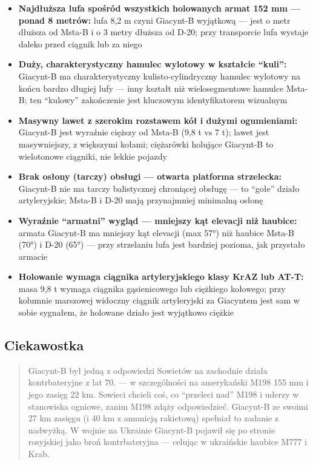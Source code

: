 \documentclass[12pt,oneside]{book}
\providecommand{\tightlist}{%
  \setlength{\itemsep}{0pt}\setlength{\parskip}{0pt}}
\begin{document}
\begin{itemize}
\tightlist
\item
  \textbf{Najdłuższa lufa spośród wszystkich holowanych armat 152 mm ---
  ponad 8 metrów:} lufa 8,2 m czyni Giacynt-B wyjątkową --- jest o metr
  dłuższa od Msta-B i o 3 metry dłuższa od D-20; przy transporcie lufa
  wystaje daleko przed ciągnik lub za niego
\item
  \textbf{Duży, charakterystyczny hamulec wylotowy w kształcie
  ``kuli'':} Giacynt-B ma charakterystyczny kulisto-cylindryczny hamulec
  wylotowy na końcu bardzo długiej lufy --- inny kształt niż
  wielosegmentowe hamulce Msta-B; ten ``kulowy'' zakończenie jest
  kluczowym identyfikatorem wizualnym
\item
  \textbf{Masywny lawet z szerokim rozstawem kół i dużymi ogumieniami:}
  Giacynt-B jest wyraźnie cięższy od Msta-B (9,8 t vs 7 t); lawet jest
  masywniejszy, z większymi kołami; ciężarówki holujące Giacynt-B to
  wielotonowe ciągniki, nie lekkie pojazdy
\item
  \textbf{Brak osłony (tarczy) obsługi --- otwarta platforma
  strzelecka:} Giacynt-B nie ma tarczy balistycznej chroniącej obsługę
  --- to ``gołe'' działo artyleryjskie; Msta-B i D-20 mają przynajmniej
  minimalną osłonę
\item
  \textbf{Wyraźnie ``armatni'' wygląd --- mniejszy kąt elevacji niż
  haubice:} armata Giacynt-B ma mniejszy kąt elevacji (max 57°) niż
  haubice Msta-B (70°) i D-20 (65°) --- przy strzelaniu lufa jest
  bardziej pozioma, jak przystało armacie
\item
  \textbf{Holowanie wymaga ciągnika artyleryjskiego klasy KrAZ lub
  AT-T:} masa 9,8 t wymaga ciągnika gąsienicowego lub ciężkiego
  kołowego; przy kolumnie marszowej widoczny ciągnik artyleryjski za
  Giacyntem jest sam w sobie sygnałem, że holowane działo jest wyjątkowo
  ciężkie
\end{itemize}

\subsection{Ciekawostka}\label{ciekawostka-32}

\begin{quote}
Giacynt-B był jedną z odpowiedzi Sowietów na zachodnie działa
kontrbateryjne z lat 70. --- w szczególności na amerykański M198 155 mm
i jego zasięg 22 km. Sowieci chcieli coś, co ``przeleci nad'' M198 i
uderzy w stanowiska ogniowe, zanim M198 zdąży odpowiedzieć. Giacynt-B ze
swoimi 27 km zasięgu (i 40 km z amunicją rakietową) spełniał to zadanie
z nadwyżką. W wojnie na Ukrainie Giacynt-B pojawił się po stronie
rosyjskiej jako broń kontrbateryjna --- celując w ukraińskie haubice
M777 i Krab.
\end{quote}
\end{document}
